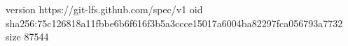 version https://git-lfs.github.com/spec/v1
oid sha256:75c126818a11fbbe6b6f616f3b5a3ccce15017a6004ba82297fca056793a7732
size 87544
